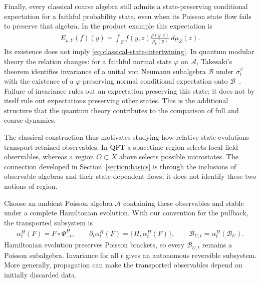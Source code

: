 \documentclass[a4paper,11pt]{article}
\theoremstyle{definition}
\theoremstyle{remark}
\newcommand{\mA}{\mathcal{A}}
\newcommand{\mB}{\mathcal{B}}
\begin{document}
Finally, every classical coarse algebra still admits a state-preserving conditional
expectation for a faithful probability state, even when its Poisson state flow fails to
preserve that algebra.  In the product example this expectation is
\begin{align}
    E_{\rho,Y}(f)(y)=\int_Z f(y,z)\frac{\rho(y,z)}{\rho_Y(y)}\,d\mu_Z(z).
\end{align}
Its existence does not imply \eqref{eq:classical-state-intertwining}.  In quantum
modular theory the relation changes: for a faithful normal state $\varphi$ on $\mA$,
Takesaki's theorem identifies invariance of a unital von Neumann subalgebra $\mB$ under
$\sigma_t^\varphi$ with the existence of a $\varphi$-preserving normal conditional
expectation onto $\mB$~\cite{Takesaki1972}.  Failure of invariance rules out an
expectation preserving this state; it does not by itself rule out expectations
preserving other states.  This is the additional structure that the quantum theory
contributes to the comparison of full and coarse dynamics.
 
The classical construction thus motivates studying how relative state evolutions
transport retained observables.  In QFT a spacetime region selects local field
observables, whereas a region $O\subset X$ above selects possible microstates.  The
connection developed in Section~\ref{section:basics} is through the inclusions of
observable algebras and their state-dependent flows; it does not identify these two
notions of region.
 
Choose an ambient Poisson algebra $\mathcal{A}$ containing these observables and stable
under a complete Hamiltonian evolution.  With our convention for the pullback, the
transported subsystem is
\begin{align}
    \alpha_t^H(F)=F\circ\Phi_{-t}^H,\qquad
    \partial_t\alpha_t^H(F)=\{H,\alpha_t^H(F)\},\qquad
    \mathcal{B}_{U,t}=\alpha_t^H(\mathcal{B}_U).
\end{align}
Hamiltonian evolution preserves Poisson brackets, so every $\mathcal{B}_{U,t}$ remains
a Poisson subalgebra.  Invariance for all $t$ gives an autonomous reversible subsystem.
More generally, propagation can make the transported observables depend on initially
discarded data.
 
\end{document}

